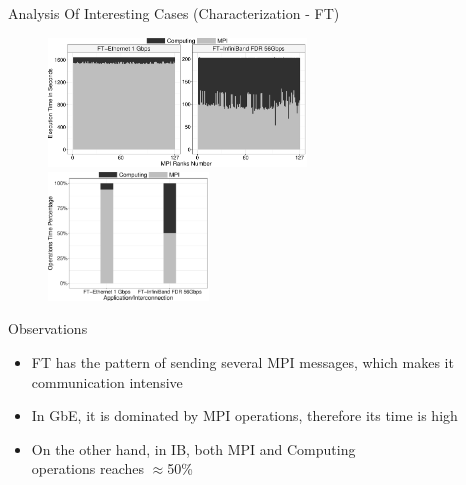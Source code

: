 \documentclass{beamer}
\begin{document}
\begin{frame}{Analysis Of Interesting Cases (Characterization - FT)}
\begin{figure}
   \includegraphics[width=0.61\textwidth]{SLIDES/img/FT.charac.pdf}
   \includegraphics[width=0.38\textwidth]{SLIDES/img/FT.percentage.pdf}
\end{figure}
\pause Observations
\begin{itemize}
    \item FT has the pattern of sending several MPI messages, which makes it \alert{communication intensive}
    \pause \item In GbE, it is \alert{dominated by MPI operations}, therefore its time is high
    \pause \item On the other hand, in IB, both MPI and Computing \\operations reaches \alert{$\approx$50\%}
\end{itemize}
\end{frame}
\end{document}
